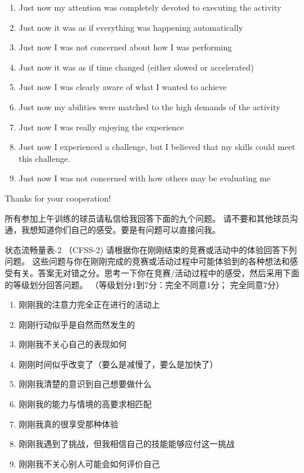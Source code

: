 \begin{CJK}{UTF8}{gbsn}
  \begin{enumerate}
    \item Just now my attention was completely devoted to executing the activity
    \item Just now it was as if everything was happening automatically
    \item Just now I was not concerned about how I was performing
    \item Just now it was as if time changed (either slowed or accelerated)
    \item Just now I was clearly aware of what I wanted to achieve
    \item Just now my abilities were matched to the high demands of the activity
    \item Just now I was really enjoying the experience
    \item Just now I experienced a challenge, but I believed that my skills could meet this challenge.
    \item Just now I was not concerned with how others may be evaluating me
  \end{enumerate}

  Thanks for your cooperation!




  所有参加上午训练的球员请私信给我回答下面的九个问题。
  请不要和其他球员沟通，我想知道你们自己的感受。要是有问题可以直接问我。


  状态流畅量表-2 （CFSS-2)
  请根据你在刚刚结束的竞赛或活动中的体验回答下列问题。 这些问题与你在刚刚完成的竞赛或活动过程中可能体验到的各种想法和感受有关。答案无对错之分。思考一下你在竞赛/活动过程中的感受，然后采用下面的等级划分回答问题。  （等级划分1到7分：完全不同意1分； 完全同意7分）

  \begin{enumerate}
    \item 刚刚我的注意力完全正在进行的活动上
    \item 刚刚行动似乎是自然而然发生的
    \item 刚刚我不关心自己的表现如何
    \item 刚刚时间似乎改变了（要么是减慢了，要么是加快了）
    \item 刚刚我清楚的意识到自己想要做什么
    \item 刚刚我的能力与情境的高要求相匹配
    \item 刚刚我真的很享受那种体验
    \item 刚刚我遇到了挑战，但我相信自己的技能能够应付这一挑战
    \item 刚刚我不关心别人可能会如何评价自己
  \end{enumerate}


\end{CJK}
